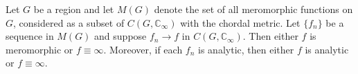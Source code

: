 Let $G$ be a region and let $M(G)$ denote the set of all meromorphic functions on $G$, considered as a subset of $C(G, \mathbb{C}_\infty)$ with the chordal metric. Let $\{f_n\}$ be a sequence in $M(G)$ and suppose $f_n \to f$ in $C(G, \mathbb{C}_\infty)$. Then either $f$ is meromorphic or $f \equiv \infty$. Moreover, if each $f_n$ is analytic, then either $f$ is analytic or $f \equiv \infty$.
